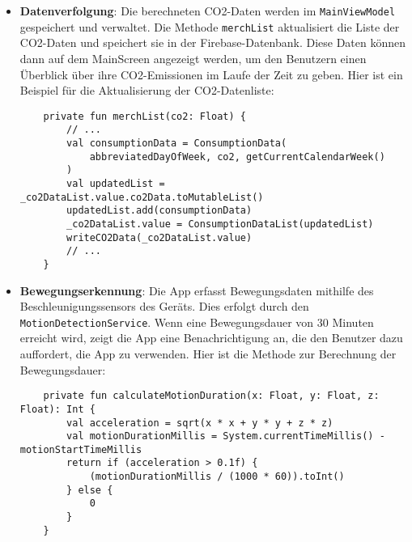 \documentclass{article}
\begin{document}
\begin{itemize}
    xxxx:
    
    \begin{lstlisting}
   \textcolor{red}{ToDo}
   
   
    \end{lstlisting}
    
    
    
        \item \textbf{Datenverfolgung}:
    Die berechneten CO2-Daten werden im \texttt{MainViewModel} gespeichert und verwaltet. Die Methode \texttt{merchList} aktualisiert die Liste der CO2-Daten und speichert sie in der Firebase-Datenbank. Diese Daten können dann auf dem MainScreen angezeigt werden, um den Benutzern einen Überblick über ihre CO2-Emissionen im Laufe der Zeit zu geben. Hier ist ein Beispiel für die Aktualisierung der CO2-Datenliste:
    
    \begin{lstlisting}
    private fun merchList(co2: Float) {
        // ...
        val consumptionData = ConsumptionData(
            abbreviatedDayOfWeek, co2, getCurrentCalendarWeek()
        )
        val updatedList = _co2DataList.value.co2Data.toMutableList()
        updatedList.add(consumptionData)
        _co2DataList.value = ConsumptionDataList(updatedList)
        writeCO2Data(_co2DataList.value)
        // ...
    }
    \end{lstlisting}

    \item \textbf{Bewegungserkennung}:
    Die App erfasst Bewegungsdaten mithilfe des Beschleunigungssensors des Geräts. Dies erfolgt durch den \texttt{MotionDetectionService}. Wenn eine Bewegungsdauer von 30 Minuten erreicht wird, zeigt die App eine Benachrichtigung an, die den Benutzer dazu auffordert, die App zu verwenden. Hier ist die Methode zur Berechnung der Bewegungsdauer:
    
    \begin{lstlisting}
    private fun calculateMotionDuration(x: Float, y: Float, z: Float): Int {
        val acceleration = sqrt(x * x + y * y + z * z)
        val motionDurationMillis = System.currentTimeMillis() - motionStartTimeMillis
        return if (acceleration > 0.1f) {
            (motionDurationMillis / (1000 * 60)).toInt()
        } else {
            0
        }
    }
    \end{lstlisting}
    

\end{itemize}
\end{document}
